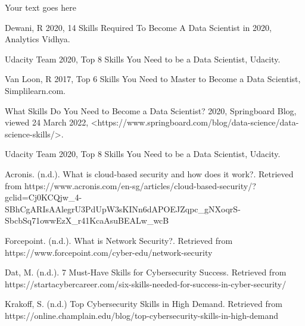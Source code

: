 \documentclass[a4paper, 11pt]{report}
\begin{document}
Your text goes here




\newpage




Dewani, R 2020, 14 Skills Required To Become A Data Scientist in 2020, Analytics Vidhya.

Udacity Team 2020, Top 8 Skills You Need to be a Data Scientist, Udacity.

Van Loon, R 2017, Top 6 Skills You Need to Master to Become a Data Scientist, Simplilearn.com.

What Skills Do You Need to Become a Data Scientist? 2020, Springboard Blog, viewed 24 March 2022, <https://www.springboard.com/blog/data-science/data-science-skills/>.

Udacity Team 2020, Top 8 Skills You Need to be a Data Scientist, Udacity.

Acronis. (n.d.). What is cloud-based security and how does it work?. Retrieved from https://www.acronis.com/en-sg/articles/cloud-based-security/?gclid=Cj0KCQjw_4-SBhCgARIsAAlegrU3PdUpW3sKINn6dAPOEJZqpc_gNXoqrS-SbcbSq71owwEzX_r41KcaAsuBEALw_wcB

Forcepoint. (n.d.). What is Network Security?. Retrieved from https://www.forcepoint.com/cyber-edu/network-security

Dat, M. (n.d.). 7 Must-Have Skills for Cybersecurity Success. Retrieved from https://startacybercareer.com/six-skills-needed-for-success-in-cyber-security/

Krakoff, S. (n.d.) Top Cybersecurity Skills in High Demand. Retrieved from https://online.champlain.edu/blog/top-cybersecurity-skills-in-high-demand
\end{document}
